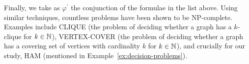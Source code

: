     Finally, we take as \(\varphi^\prime\) the conjunction of the formulae in the list above.
Using similar techniques, countless problems have been shown to be \textsf{NP}-complete. Examples include \textsf{CLIQUE} (the problem of deciding whether a graph has a \(k\)-clique for \(k\in\mathbb{N}\)),  \textsf{VERTEX-COVER} (the problem of deciding whether a graph has a covering set of vertices with cardinality \(k\) for \(k\in\mathbb{N}\)), and crucially for our study, \textsf{HAM} (mentioned in Example~\ref{ex:decision-problems}).

